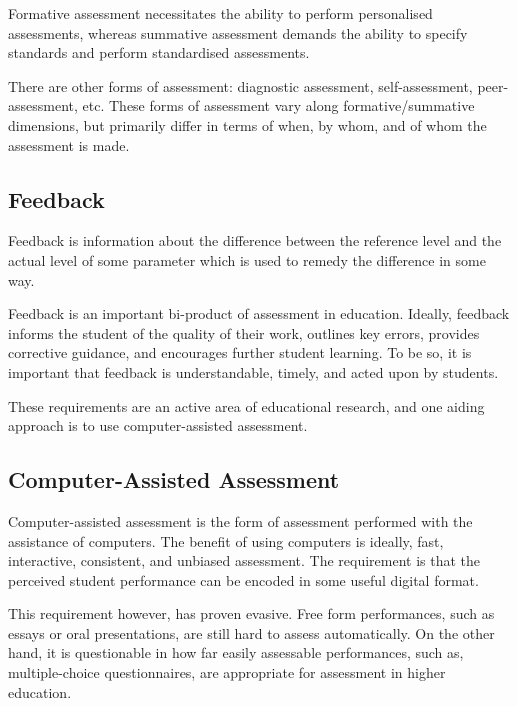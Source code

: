 Formative assessment necessitates the ability to perform personalised
assessments, whereas summative assessment demands the ability to specify
standards and perform standardised assessments.

There are other forms of assessment: diagnostic assessment, self-assessment,
peer-assessment, etc. \cite{bull-mckenna-2004,topping-1998}  These forms of
assessment vary along formative/summative dimensions, but primarily differ in
terms of when, by whom, and of whom the assessment is made.

\subsection{Feedback}

\label{section:assessment-in-computer-science:feedback}

Feedback is information about the difference between the reference level and
the actual level of some parameter which is used to remedy the difference in
some way\cite{ramaprasad1989}.

Feedback is an important bi-product of assessment in
education\cite{black-william-1998}. Ideally, feedback informs the student of
the quality of their work, outlines key errors, provides corrective guidance,
and encourages further student learning. To be so, it is important that
feedback is understandable, timely, and acted upon by
students\cite{gibbs-simpson-2004}.

These requirements are an active area of educational research, and one aiding
approach is to use computer-assisted assessment.

\subsection{Computer-Assisted Assessment}

Computer-assisted assessment is the form of assessment performed with the
assistance of computers\cite{conole-warburton-2005}. The benefit of using
computers is ideally, fast, interactive, consistent, and unbiased
assessment\cite{ala-mutka-2005}. The requirement is that the perceived student
performance can be encoded in some useful digital format.

This requirement however, has proven evasive. Free form performances, such as
essays or oral presentations, are still hard to assess
automatically\cite{valenti-et-al-2003}.  On the other hand, it is questionable
in how far easily assessable performances, such as, multiple-choice
questionnaires, are appropriate for assessment in higher
education\cite{conole-warburton-2005}.

